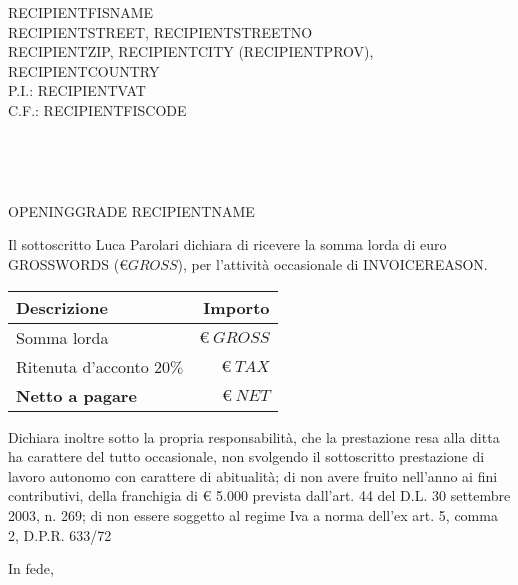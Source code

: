 \documentclass[12pt, a4paper]{letter} %
\renewcommand{\opening}[1]{
	{\centering\fromaddress\vspace{0.05\textheight} \\ %
	}%
	{\raggedright \toname \\ \toaddress \par} %
	\vspace{1cm} %
	\noindent #1 %
}
\renewcommand{\closing}[1]{
	\vspace{2.5mm} %
	\noindent %
	\hspace*{\longindentation} %
	\parbox{\indentedwidth}{
		\raggedright
		#1 %
		\vskip 1.65cm %
		\fromsig %
	}
}
\begin{document}

\begin{letter}{
	RECIPIENTFISNAME\\ %
	RECIPIENTSTREET, RECIPIENTSTREETNO\\ %
	RECIPIENTZIP, RECIPIENTCITY (RECIPIENTPROV), RECIPIENTCOUNTRY\\ %
	P.I.: RECIPIENTVAT\\ %
	C.F.: RECIPIENTFISCODE %
}


\opening{OPENINGGRADE RECIPIENTNAME}

Il sottoscritto Luca Parolari dichiara di ricevere la somma lorda di euro
GROSSWORDS ($\euro GROSS$), per l'attività occasionale di INVOICEREASON.

\begin{center}
\begin{tabularx}{300pt}{|X|r|}
  	\textbf{Descrizione} & \textbf{Importo}\\
	\hline
	Somma lorda & $\euro\ GROSS$\\
	Ritenuta d'acconto $20\%$ & $\euro\ TAX$\\
	\textbf{Netto a pagare} & $\euro\ NET$\\
\end{tabularx}
\end{center}

Dichiara inoltre sotto la propria responsabilità, che la prestazione resa alla
ditta ha carattere del tutto occasionale, non svolgendo il sottoscritto
prestazione di lavoro autonomo con carattere di abitualità; di non avere fruito
nell'anno ai fini contributivi, della franchigia di \euro{} 5.000 prevista dall'art. 44
del D.L. 30 settembre 2003, n. 269; di non essere soggetto al regime Iva a
norma dell'ex art. 5, comma 2, D.P.R. 633/72

\closing{In fede,}




\end{letter}
\end{document}
